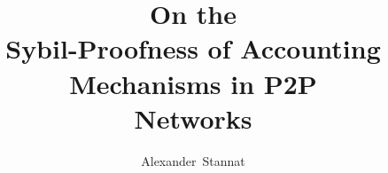 \documentclass[whitelogo]{tudelft-report}
\theoremstyle{definition}
\theoremstyle{theorem}
\theoremstyle{proposition}
\theoremstyle{corollary}
\theoremstyle{lemma}
\theoremstyle{example}
\theoremstyle{remark}
\begin{document}
\frontmatter


\title[tudelft-white]{{\fontsize{45}{49}\selectfont On the \vspace{0.1em}\\ Sybil-Proofness of Accounting Mechanisms in P2P\vspace{0.2em}\\ Networks}}%
\author[tudelft-white]{Alexander\ Stannat}
\makecover[split]






\tableofcontents

\mainmatter












%



\appendix
\end{document}
